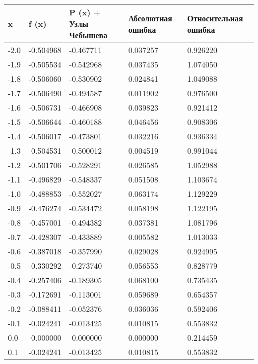 \documentclass[13pt, a4paper, twoside]{article}
\begin{document}
\begin{table}[!ht]
    \centering
    \begin{tabular}{|l|l|l|l|l|}
    \hline
        x & f (x) & P (x) + Узлы Чебышева & Абсолютная ошибка & Относительная ошибка \\ \hline
        -2.0 & -0.504968 & -0.467711 & 0.037257 & 0.926220 \\ \hline
        -1.9 & -0.505534 & -0.542968 & 0.037435 & 1.074050 \\ \hline
        -1.8 & -0.506060 & -0.530902 & 0.024841 & 1.049088 \\ \hline
        -1.7 & -0.506490 & -0.494587 & 0.011902 & 0.976500 \\ \hline
        -1.6 & -0.506731 & -0.466908 & 0.039823 & 0.921412 \\ \hline
        -1.5 & -0.506644 & -0.460188 & 0.046456 & 0.908306 \\ \hline
        -1.4 & -0.506017 & -0.473801 & 0.032216 & 0.936334 \\ \hline
        -1.3 & -0.504531 & -0.500012 & 0.004519 & 0.991044 \\ \hline
        -1.2 & -0.501706 & -0.528291 & 0.026585 & 1.052988 \\ \hline
        -1.1 & -0.496829 & -0.548337 & 0.051508 & 1.103674 \\ \hline
        -1.0 & -0.488853 & -0.552027 & 0.063174 & 1.129229 \\ \hline
        -0.9 & -0.476274 & -0.534472 & 0.058198 & 1.122195 \\ \hline
        -0.8 & -0.457001 & -0.494382 & 0.037381 & 1.081796 \\ \hline
        -0.7 & -0.428307 & -0.433889 & 0.005582 & 1.013033 \\ \hline
        -0.6 & -0.387018 & -0.357990 & 0.029028 & 0.924995 \\ \hline
        -0.5 & -0.330292 & -0.273740 & 0.056553 & 0.828779 \\ \hline
        -0.4 & -0.257406 & -0.189305 & 0.068100 & 0.735435 \\ \hline
        -0.3 & -0.172691 & -0.113001 & 0.059689 & 0.654357 \\ \hline
        -0.2 & -0.088411 & -0.052376 & 0.036036 & 0.592406 \\ \hline
        -0.1 & -0.024241 & -0.013425 & 0.010815 & 0.553832 \\ \hline
        0.0 & -0.000000 & -0.000000 & 0.000000 & 0.214459 \\ \hline
        0.1 & -0.024241 & -0.013425 & 0.010815 & 0.553832 \\ \hline

\end{tabular}
\end{table}
\end{document}
